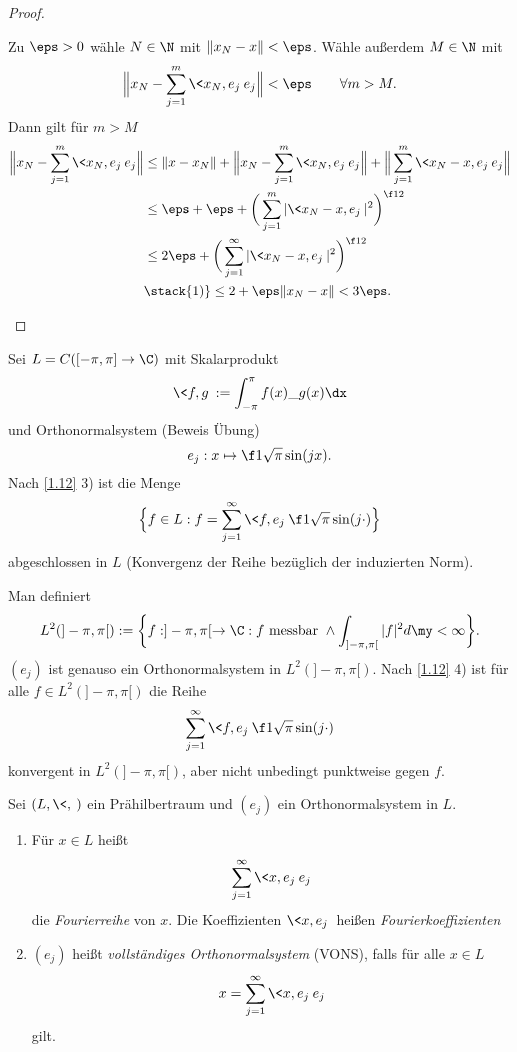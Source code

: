 \documentclass{mycourse}
\begin{document}
\begin{st}
\begin{proof}
\begin{enumerate}[1)]
				Zu $\eps > 0$ wähle $N\in \N$ mit $\|x_N-x\| < \eps$.
				Wähle außerdem $M \in \N$ mit
				\[
					\Big\|x_N- \sum_{j=1}^m \<x_N,e_j\> e_j \Big\| < \eps
					\qquad \forall m > M.
				\]
				Dann gilt für $m > M$
				\begin{align*}
					\Big\|x_N- \sum_{j=1}^m \<x_N,e_j\> e_j \Big\| 
					&\le \|x-x_N\| + \Big\|x_N - \sum_{j=1}^m \<x_N,e_j\> e_j \Big\| + \Big\| \sum_{j=1}^m \<x_N-x,e_j\> e_j \Big\|	\\
					&\le \eps + \eps + \bigg(\sum_{j=1}^m |\<x_N-x,e_j\>|^2 \bigg)^{\f 12} \\
					&\le 2\eps + \bigg(\sum_{j=1}^\infty |\<x_N-x,e_j\>|^2 \bigg)^{\f 12} \\
					&\stack{1)}\le 2 + \eps\|x_N-x\|
					< 3 \eps.
				\end{align*}
		\end{enumerate}
	\end{proof}
\end{st}

\begin{ex} \label{1.13}
	Sei $L = C([-\pi,\pi] \to \C)$ mit Skalarprodukt
	\[
		\<f,g\> := \int_{-\pi}^{\pi}f(x)\_{g(x)} \dx
	\]
	und Orthonormalsystem (Beweis Übung)
	\[
		e_j : x \mapsto \f 1{\sqrt{\pi}} \sin(jx).
	\]
	Nach \ref{1.12} 3) ist die Menge
	\[
		\Big\{ f \in L : f = \sum_{j=1}^\infty \<f,e_j\> \f 1{\sqrt{\pi}}\sin(j \cdot) \Big\}
	\]
	abgeschlossen in $L$ (Konvergenz der Reihe bezüglich der induzierten Norm).

	Man definiert
	\[
		L^2(]-\pi,\pi[) := \bigg\{ f: ]-\pi,\pi[ \to \C : f \text{ messbar } \land \int_{]-\pi,\pi[}|f|^2 d\my < \infty \bigg\}.
	\]
	$(e_j)$ ist genauso ein Orthonormalsystem in $L^2(]-\pi,\pi[)$.
	Nach \ref{1.12} 4) ist für alle $f \in L^2(]-\pi,\pi[)$ die Reihe
	\[
		\sum_{j=1}^\infty \<f,e_j\> \f 1{\sqrt{\pi}} \sin(j \cdot)
	\]
	konvergent in $L^2(]-\pi,\pi[)$, aber nicht unbedingt punktweise gegen $f$.
\end{ex}

\begin{df} \label{1.14}
	Sei $(L, \<,\>)$ ein Prähilbertraum und $(e_j)$ ein Orthonormalsystem in $L$.
	\begin{enumerate}[1)]
		\item
			Für $x\in L$ heißt
			\[
				\sum_{j=1}^\infty \<x,e_j\> e_j
			\]
			die \emph{Fourierreihe} von $x$.
			Die Koeffizienten $\<x,e_j\>$ heißen \emph{Fourierkoeffizienten}
		\item
			$(e_j)$ heißt \emph{vollständiges Orthonormalsystem} (VONS), falls für alle $ x\in L $
			\[
				x = \sum_{j=1}^\infty \<x,e_j\> e_j
			\]
			gilt.
	\end{enumerate}
\end{df}
\end{document}
